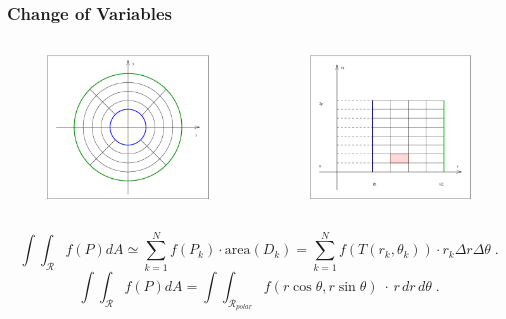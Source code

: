 \begin{frame}
  \frametitle{Change of Variables}

  \begin{columns}
  \column{6cm}
  \begin{figure}
        \includegraphics[width=2in]{../images/ring_region_divided.eps}
    \end{figure}
  \column{6cm}
  \begin{figure}
        \includegraphics[width=2in]{../images/ring_region_polar_divided.eps}
    \end{figure}
  \end{columns}

  $$\int\!\!\!\int_{\mathcal{R}} f(P) dA \simeq \sum_{k=1}^N f(P_k)\cdot \text{area}(D_k) = \sum_{k=1}^N f(T(r_k,\theta_k))\cdot  r_k \Delta r \Delta \theta\; .$$
$$\int\!\!\!\int_{\mathcal{R}} f(P) dA = \int\!\!\!\int_{\mathcal{R}_{polar}} f(r\cos{\theta},r\sin{\theta})\;\cdot \,r\, dr\, d\theta \; .$$
\end{frame}

